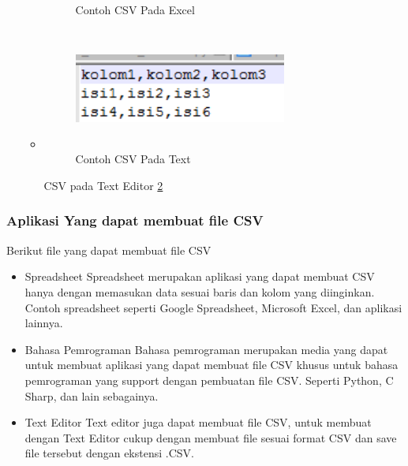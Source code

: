 \begin{itemize}
\begin{itemize}
\begin{figure}[!htbp]
								\caption{Contoh CSV Pada Excel}
								\label{1174035_CSVExcel}
							\end{figure}
							\item \begin{figure}[!htbp]
								\centering
								\includegraphics[height=4cm, width=7cm]{figures/chapter4/1174035_CSVText.jpg}
								\caption{Contoh CSV Pada Text}
								\label{1174035_CSVText}
							\end{figure}
							CSV pada Text Editor \ref{1174035_CSVText}
							
						  \end{itemize}
\end{itemize}
\subsubsection{Aplikasi Yang dapat membuat file CSV}
Berikut file yang dapat membuat file CSV
\begin{itemize}
	\item Spreadsheet \linebreak Spreadsheet merupakan aplikasi yang dapat membuat CSV hanya dengan memasukan data sesuai baris dan kolom yang diinginkan. Contoh spreadsheet seperti Google Spreadsheet, Microsoft Excel, dan aplikasi lainnya. 
	\item Bahasa Pemrograman \linebreak Bahasa pemrograman merupakan media yang dapat untuk membuat aplikasi yang dapat membuat file CSV khusus untuk bahasa pemrograman yang support dengan pembuatan file CSV. Seperti Python, C Sharp, dan lain sebagainya.
	\item Text Editor \linebreak Text editor juga dapat membuat file CSV, untuk membuat dengan Text Editor cukup dengan membuat file sesuai format CSV dan save file tersebut dengan ekstensi .CSV.
\end{itemize}
